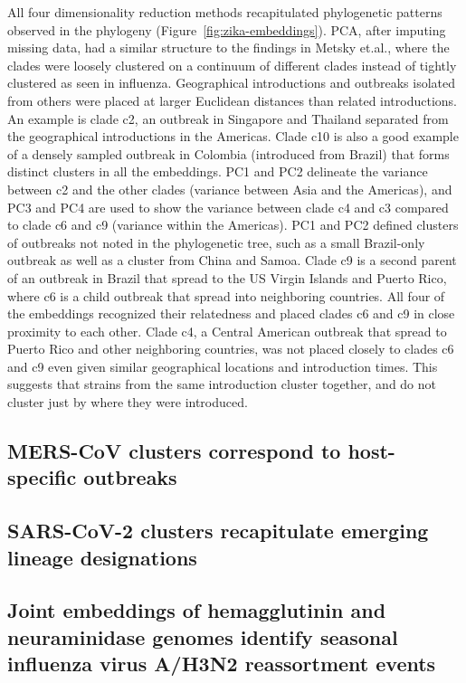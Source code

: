 \documentclass[9pt,lineno]{elife}
\begin{document}
All four dimensionality reduction methods recapitulated phylogenetic patterns observed in the phylogeny (Figure~\ref{fig:zika-embeddings}).
PCA, after imputing missing data, had a similar structure to the findings in Metsky et.al., where the clades were loosely clustered on a continuum of different clades instead of tightly clustered as seen in influenza.
Geographical introductions and outbreaks isolated from others were placed at larger Euclidean distances than related introductions.
An example is clade c2, an outbreak in Singapore and Thailand separated from the geographical introductions in the Americas.
Clade c10 is also a good example of a densely sampled outbreak in Colombia (introduced from Brazil) that forms distinct clusters in all the embeddings.
PC1 and PC2 delineate the variance between c2 and the other clades (variance between Asia and the Americas), and PC3 and PC4 are used to show the variance between clade c4 and c3 compared to clade c6 and c9 (variance within the Americas).
PC1 and PC2 defined clusters of outbreaks not noted in the phylogenetic tree, such as a small Brazil-only outbreak as well as a cluster from China and Samoa.
Clade c9 is a second parent of an outbreak in Brazil that spread to the US Virgin Islands and Puerto Rico, where c6 is a child outbreak that spread into neighboring countries.
All four of the embeddings recognized their relatedness and placed clades c6 and c9 in close proximity to each other.
Clade c4, a Central American outbreak that spread to Puerto Rico and other neighboring countries, was not placed closely to clades c6 and c9 even given similar geographical locations and introduction times.
This suggests that strains from the same introduction cluster together, and do not cluster just by where they were introduced.

\subsection*{MERS-CoV clusters correspond to host-specific outbreaks}

\subsection*{SARS-CoV-2 clusters recapitulate emerging lineage designations}

\subsection*{Joint embeddings of hemagglutinin and neuraminidase genomes identify seasonal influenza virus A/H3N2 reassortment events}
\end{document}
